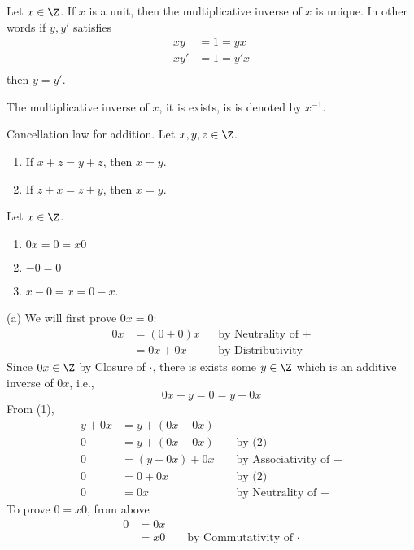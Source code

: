 \begin{prop}
  Let $x \in \Z$.
  If $x$ is a unit, then the multiplicative inverse of $x$ is unique.
  In other words if $y,y'$ satisfies
  \begin{align*}
    x  y &= 1 = y x \\
    x  y' &= 1 = y' x \\
  \end{align*}
  then $y = y'$.
\end{prop}

\begin{defn}
  The multiplicative inverse of $x$, it is exists, is is denoted by $x^{-1}$.
\end{defn}

\begin{prop}
  Cancellation law for addition.
  Let $x, y, z \in \Z$.
  \begin{enumerate}[nosep,label=\textnormal{(\alph*)}]
    \item If $x + z = y + z$, then $x = y$.
    \item If $z + x = z + y$, then $x = y$.
  \end{enumerate}
\end{prop}

\begin{prop}
  Let $x \in \Z$.
  \begin{enumerate}[nosep,label=\textnormal{(\alph*)}]
  \item $0x = 0 = x0$
  \item $-0 = 0$
  \item $x - 0 = x = 0 - x$.
  \end{enumerate}
\end{prop}
\proof
(a) We will first prove $0x = 0$:
\begin{align*}
  0x &= (0 + 0)x & & \text{by Neutrality of $+$} \\
     &= 0x + 0x  & & \text{by Distributivity} \tag{1}
\end{align*}
Since $0x \in \Z$ by Closure of $\cdot$, there is
exists some $y \in \Z$ which is an additive inverse of $0x$, i.e.,
\[
0x + y = 0 = y + 0x \tag{2}
\]
From (1),
\begin{align*}
  y + 0x &= y + (0x + 0x)  \\
  0      &= y + (0x + 0x) & & \text{ by (2)} \\
  0      &= (y + 0x) + 0x & & \text{ by Associativity of $+$} \\
  0      &= 0 + 0x        & & \text{ by (2)} \\
  0      &= 0x            & & \text{ by Neutrality of $+$}
\end{align*}
To prove $0 = x0$, from above
\begin{align*}
  0 &= 0x \\
    &= x0 & & \text{ by Commutativity of $\cdot$}
\end{align*}

